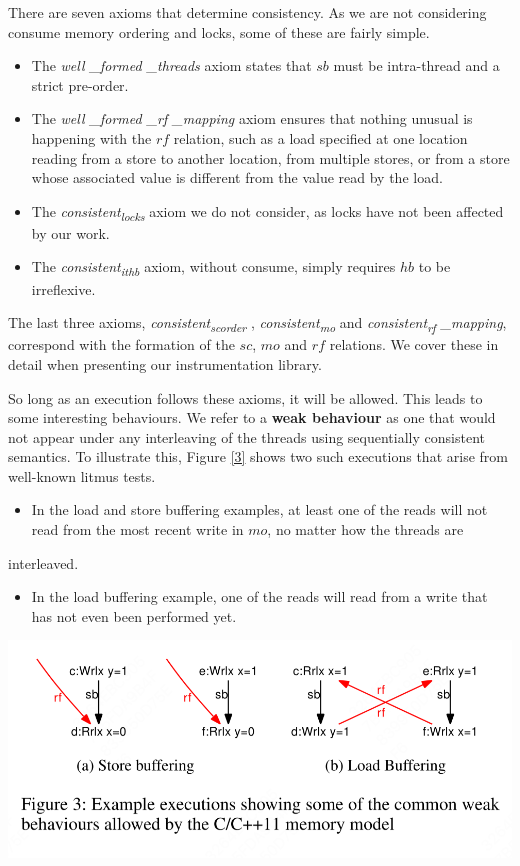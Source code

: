 \documentclass[11pt]{article}
\begin{document}
There are seven axioms that determine consistency. As we are not considering consume memory ordering
and locks, some of these are fairly simple.
\begin{itemize}
\item The \emph{well \_formed \_threads} axiom states that \(sb\) must be intra-thread and a strict pre-order.
\item The \emph{well \_formed \_rf \_mapping} axiom ensures that nothing unusual is happening with the \(rf\)
relation, such as a load specified at one location reading from a store to another location, from
multiple stores, or from a store whose associated value is different from the value read by the
load.
\item The \emph{consistent\textsubscript{locks}} axiom we do not consider, as locks have not been affected by our work.
\item The \emph{consistent\textsubscript{ithb}} axiom, without consume, simply requires \(hb\) to be irreflexive.
\end{itemize}

The last three axioms, \emph{consistent\textsubscript{sc}\textsubscript{order}} , \emph{consistent\textsubscript{mo}} and \emph{consistent\textsubscript{rf} \_mapping}, correspond with
the formation of the \(sc\), \(mo\) and \(rf\) relations. We cover these in detail when presenting our
instrumentation library.

So long as an execution follows these axioms, it will be allowed. This leads to some interesting
behaviours. We refer to a \textbf{weak behaviour} as one that would not appear under any interleaving of the
threads using sequentially consistent semantics. To illustrate this, Figure \ref{3} shows two such
executions that arise from well-known litmus tests.
\begin{itemize}
\item In the load and store buffering  examples, at least one of the reads will not read from the most recent write in \(mo\), no matter how the threads are
\end{itemize}
interleaved.
\begin{itemize}
\item In the load buffering example, one of the reads will read from a write that has not even been
performed yet.
\end{itemize}

\begin{center}
\includegraphics[width=.7\textwidth]{../../images/papers/128.png}
\label{3}
\end{center}
\end{document}
